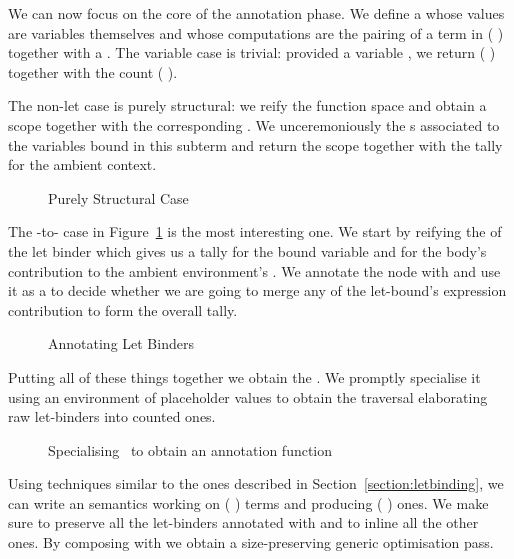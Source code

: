 We can now focus on the core of the annotation phase. We define a
 whose values are variables themselves and whose computations
are the pairing of a term in {(  )} together with
a . The variable case is trivial: provided a variable ,
we return {( )} together with the count {( )}.

The non-let case is purely structural: we reify the  function
space and obtain a scope together with the corresponding . We
unceremoniously  the s associated to the variables
bound in this subterm and return the scope together with the tally for
the ambient context.

\begin{figure}[h]
  \caption{Purely Structural Case}
\end{figure}

The -to- case in Figure~\ref{fig:lettoclet} is the most
interesting one. We start by reifying the  of the let binder which
gives us a tally  for the bound variable and  for the body's
contribution to the ambient environment's . We annotate the node
with  and use it as a  to decide whether we are going to
merge any of the let-bound's expression contribution  to form the
overall tally.

\begin{figure}[h]
  \caption{Annotating Let Binders}\label{fig:lettoclet}
\end{figure}

Putting all of these things together we obtain the  .
We promptly specialise it using an environment of placeholder values to obtain
the traversal  elaborating raw let-binders into counted ones.

\begin{figure}[h]
\caption{Specialising ~to obtain an annotation function}
\end{figure}

Using techniques similar to the ones described in Section~\ref{section:letbinding},
we can write an  semantics working on {(  )} terms
and producing {(  )} ones. We make sure to preserve all the
let-binders annotated with  and to inline all the other ones. By composing
 with  we obtain a size-preserving generic optimisation pass.
